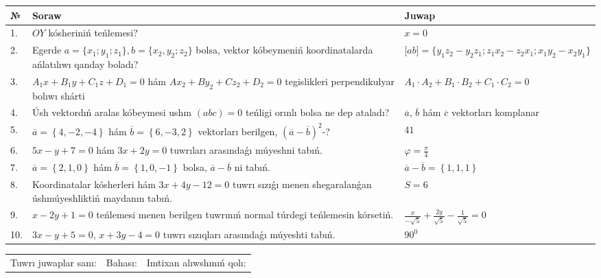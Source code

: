 \documentclass{article}
\begin{document}
\begin{tabular}{|m{0.7cm}|m{10cm}|m{4cm}|}
\hline
№ & Soraw & Juwap \\
\hline
1. & $OY$ kósheriniń teńlemesi? & $x=0$ \\
\hline
2. & Egerde $a=\{ x_1; y_1; z_1\}, b=\{ x_2, y_2; z_2\}$ bolsa, vektor kóbeymeniń koordinatalarda ańlatılıwı qanday boladı? &  $\lbrack ab\rbrack=\{y_1z_2-y_2z_1; z_1x_2-z_2x_1; x_1y_2-x_2y_1\}$ \\
\hline
3. & $A_1x+B_1y+C_1z+D_1=0$ hám $Ax_2+By_2+Cz_2+D_2=0$ tegislikleri perpendikulyar bolıwı shárti & $A_1\cdot A_2+B_1\cdot B_2+C_1\cdot C_2=0$ \\
\hline
4. & Úsh vektordıń aralas kóbeymesi ushın $(abc)=0$ teńligi orınlı bolsa ne dep ataladı? & $\overline{a}$, $\overline{b}$ hám $\overline{c}$ vektorları komplanar \\
\hline
5. & $\overline{a}=\left\{ 4,-2,-4 \right\}$ hám $\overline{b}=\left\{ 6,-3, 2 \right\}$ vektorları berilgen, $(\overline{a}-\overline{b}) ^{2}$-? & $41$ \\
\hline
6. & $5x-y+7=0$ hám $3x+2y=0$ tuwrıları arasındaǵı múyeshni tabıń. & $\varphi=\frac{\pi}{4}$ \\
\hline
7. & $\overline{a}=\left\{ 2, 1, 0 \right\}$ hám $\overline{b}=\left\{ 1, 0,-1 \right\}$ bolsa, $\overline{a}-\overline{b}$ ni tabıń. & $\overline{a} -\overline{b} = \left\{ 1,1,1 \right\}$ \\
\hline
8. & Koordinatalar kósherleri hám $ 3x+4y-12=0 $ tuwrı sızıǵı menen shegaralanǵan úshmúyeshliktiń maydanın tabıń. & $ S=6 $ \\
\hline
9. & $x-2y+1=0$ teńlemesi menen berilgen tuwrınıń normal túrdegi teńlemesin kórsetiń. & $\frac{x}{- \sqrt{5}}+\frac{2y}{\sqrt{5}}-\frac{1}{\sqrt{5}}=0$ \\
\hline
10. & $3x-y+5=0$, $x+3y-4=0$ tuwrı sızıqları arasındaǵı múyeshti tabıń. & $90^{0}$ \\
\hline
\end{tabular}

\vspace{1cm}

\begin{tabular}{lll}
Tuwrı juwaplar sanı: \underline{\hspace{1.5cm}} & 
Bahası: \underline{\hspace{1.5cm}} & 
Imtixan alıwshınıń qolı: \underline{\hspace{2cm}} \\
\end{tabular}
\end{document}
